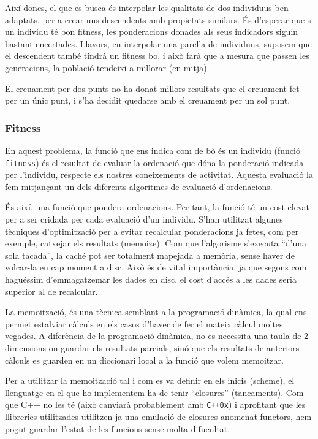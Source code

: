 \documentclass[titlepage,a4paper,12pt]{book}
\begin{document}
Així doncs, el que es busca és interpolar les qualitats de dos individuus ben
adaptats, per a crear uns descendents amb propietats similars.  És d'esperar que
si un individu té bon fitness, les ponderacions donades als seus indicadors
siguin bastant encertades.  Llavors, en interpolar una parella de individuus,
suposem que el descendent també tindrà un fitness bo, i això farà que a mesura
que passen les generacions, la població tendeixi a millorar (en mitja).

El creuament per dos punts no ha donat millors resultats que el creuament fet
per un únic punt, i s'ha decidit quedarse amb el creuament per un sol punt.

\subsubsection{Fitness} %
\label{ssub:Fitness}
En aquest problema, la funció que ens indica com de bò és un individu (funció
\texttt{fitness}) és el resultat de evaluar la ordenació que dóna la ponderació
indicada per l'individu, respecte els nostres coneixements de activitat. Aquesta
evaluació la fem mitjançant un dels diferents algoritmes de evaluació d'ordenacions.


És així, una funció que pondera ordenacions.  Per tant, la funció té un cost
elevat per a ser cridada per cada evaluació d'un individu.  S'han utilitzat
algunes tècniques d'optimització per a evitar recalcular ponderacions ja fetes,
com per exemple, catxejar els resultats (memoize).  Com que l'algorisme
s'executa ``d'una sola tacada'', la caché pot ser totalment mapejada a memòria,
sense haver de volcar-la en cap moment a disc.  Això és de vital importància, ja
que segons com haguéssim d'emmagatzemar les dades en disc, el cost d'accés a les
dades seria superior al de recalcular. 

La memoització, és una tècnica semblant a la programació dinàmica, la qual ens
permet estalviar càlculs en els casos d'haver de fer el mateix càlcul moltes
vegades.  A diferència de la programació dinàmica, no es necessita una taula de
2 dimensions on guardar els resultats parcials, sinó que els resultats de
anteriors càlculs es guarden en un diccionari local a la funció que volem
memoitzar.  

Per a utilitzar la memoització tal i com es va definir en els inicis
(scheme), el llenguatge en el que ho implementem ha de tenir ``closures''
(tancaments).  Com que C++ no les té (això canviarà probablement amb
\texttt{C++0x}) %
i aprofitant que les llibreries utilitzades utilitzen ja una emulació de
closures anomenat functors, hem pogut guardar l'estat de les funcions sense
molta difucultat. 
\end{document}
